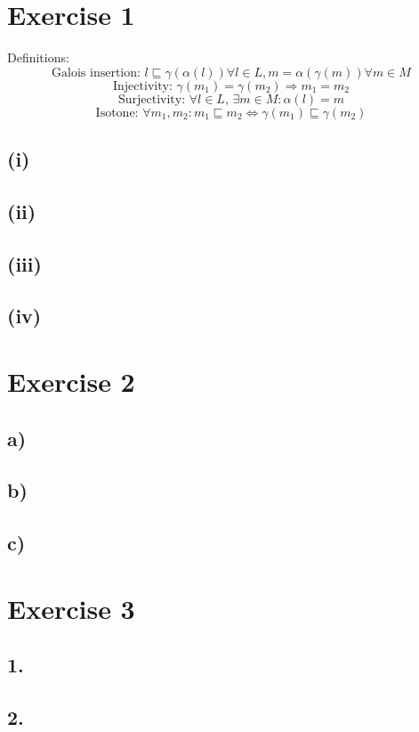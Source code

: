 \documentclass[fleqn,12pt]{article}
\begin{document}
\section*{Exercise 1}
Definitions:
$$\text{Galois insertion: }l \sqsubseteq \gamma(\alpha(l)) \forall l \in L, m = \alpha(\gamma(m)) \forall m \in M$$
$$\text{Injectivity: }\gamma(m_1) = \gamma(m_2) \Rightarrow m_1 = m_2$$
$$\text{Surjectivity: } \forall l \in L \text{,  }\exists m \in M : \alpha(l) = m$$
$$\text{Isotone: }\forall m_1,m_2:m_1 \sqsubseteq m_2 \Leftrightarrow \gamma(m_1) \sqsubseteq \gamma(m_2)$$
\subsection*{(i)}
\subsection*{(ii)}
\subsection*{(iii)}
\subsection*{(iv)}

\section*{Exercise 2}
\subsection*{a)}
\subsection*{b)}
\subsection*{c)}

\section*{Exercise 3}
\subsection*{1.}
\subsection*{2.}
\end{document}
